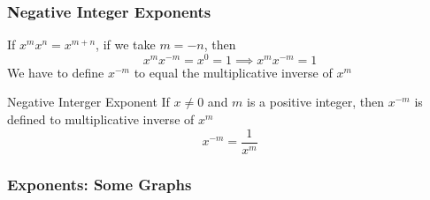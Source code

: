 \documentclass{beamer}
\begin{document}
\begin{frame}
  \frametitle{Negative Integer Exponents}
  If \(x^{m}x^{n} = x^{m+n}\), if we take \(m = -n \), then 
  \[x^{m}x^{-m} = x^{0} = 1 \implies x^{m}x^{-m} = 1\]
  We have to define \(x^{-m}\) to equal the multiplicative inverse of \(x^{m}\)
\begin{block}{Negative Interger Exponent}
  If \(x \neq 0\) and \(m\) is a positive integer, then \(x^{-m}\) is defined to multiplicative inverse of \(x^{m}\) 
  \[x^{-m} = \frac{1}{x^{m}}\]
  
\end{block}
\end{frame}
\begin{frame}
  \frametitle{Exponents: Some Graphs}
  
  

  

\end{frame}
\end{document}
